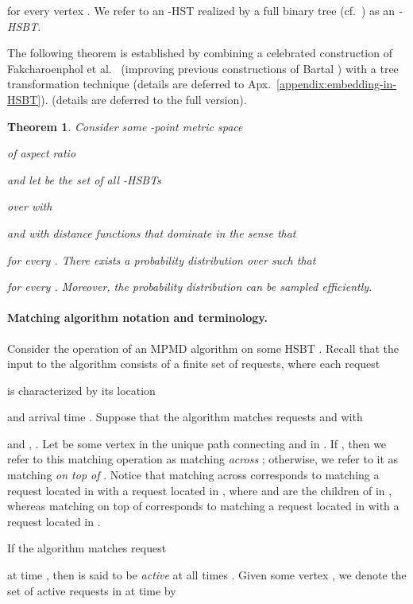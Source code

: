 \documentclass[11pt]{article}
\def\LongVersion{}
\def\LongVersionEnd{}
\def\ShortVersion{}
\def\ShortVersionEnd{}
\newtheorem{theorem}{Theorem}[section]
\theoremstyle{definition}
\theoremstyle{plain}
\newtheorem{theorem}{Theorem}
\theoremstyle{definition}
\theoremstyle{plain}
\newtheorem{theorem}{Theorem}[section]
\theoremstyle{definition}
\theoremstyle{plain}
\newcommand{\Appendix}{Apx.}
\begin{document}
for every vertex
.
We refer to an -HST realized by a full binary tree  (cf.\
\cite{CoteMP2008}) as an \emph{-HSBT}.

The following theorem is established by combining a celebrated construction of
Fakcharoenphol et al.~\cite{FakcharoenpholRT2004} (improving previous
constructions of Bartal \cite{Bartal1996,Bartal1998}) with a tree
transformation technique \cite{PattShamir2015}
\LongVersion (details are deferred to \Appendix{}~\ref{appendix:embedding-in-HSBT}).
\LongVersionEnd \ShortVersion (details are deferred to the full version).
\ShortVersionEnd 

\begin{theorem} \label{theorem:HSBT}
Consider some -point metric space

of aspect ratio

and let  be the set of all -HSBTs

over  with

and with
distance functions  that dominate  in the sense that

for every .
There exists a probability distribution  over  such
that

for every .
Moreover, the probability distribution  can be sampled
efficiently.
\end{theorem}

\paragraph{Matching algorithm notation and terminology.}
Consider the operation of an MPMD algorithm on some HSBT .
\LongVersion Recall that the input to the algorithm consists of a finite set  of
requests, where each request

is characterized by its location

and arrival time
.
\LongVersionEnd Suppose that the algorithm matches requests  and  with

and
,
.
Let  be some vertex in the unique path connecting  and  in .
If
,
then we refer to this matching operation as matching \emph{across} ;
otherwise, we refer to it as matching \emph{on top of} .
Notice that matching across  corresponds to matching a request located in
 with a request located in , where  and
 are the children of  in , whereas matching on top of 
corresponds to matching a request located in  with a request
located in .

If the algorithm matches request
\LongVersion 
\LongVersionEnd \ShortVersion 
\ShortVersionEnd at time , then  is said to be \emph{active} at all times
.
Given some vertex , we denote the set of active requests in
 at time  by
\end{document}
